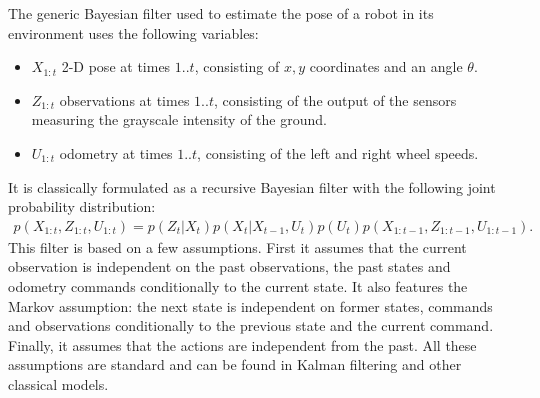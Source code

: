 \documentclass{svmult}
\begin{document}


The generic Bayesian filter used to estimate the pose of a robot in its environment uses the following variables:
\begin{itemize}
\item $X_{1:t}$ 2-D pose at times $1..t$, consisting of $x,y$ coordinates and an angle $\theta$.
\item $Z_{1:t}$ observations at times $1..t$, consisting of the output of the sensors measuring the grayscale intensity of the ground.
\item $U_{1:t}$ odometry at times $1..t$, consisting of the left and right wheel speeds.
\end{itemize}

It is classically formulated as a recursive Bayesian filter with the following joint probability distribution:
\begin{equation}
\begin{split}
p(X_{1:t}, Z_{1:t}, U_{1:t}) = p(Z_t|X_t) p(X_t|X_{t-1}, U_{t}) p(U_t) p(X_{1:t-1}, Z_{1:t-1}, U_{1:t-1}).
\end{split}
\end{equation}
This filter is based on a few assumptions.
First it assumes that the current observation is independent on the past observations, the past states and odometry commands conditionally to the current state.
It also features the Markov assumption: the next state is independent on former states, commands and observations conditionally to the previous state and the current command.
Finally, it assumes that the actions are independent from the past.
All these assumptions are standard and can be found in Kalman filtering and other classical models.
\end{document}
